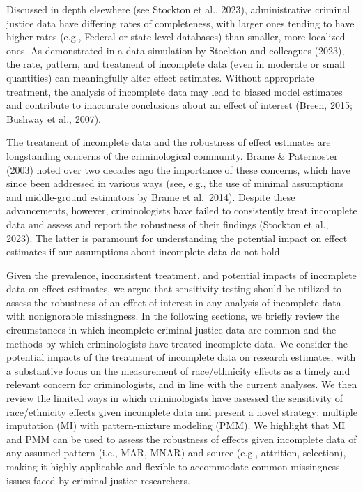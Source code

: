 \documentclass[
  letterpaper,
  DIV=11,
  numbers=noendperiod]{scrartcl}
\begin{document}
Discussed in depth elsewhere (see Stockton et al., 2023), administrative
criminal justice data have differing rates of completeness, with larger
ones tending to have higher rates (e.g., Federal or state-level
databases) than smaller, more localized ones. As demonstrated in a data
simulation by Stockton and colleagues (2023), the rate, pattern, and
treatment of incomplete data (even in moderate or small quantities) can
meaningfully alter effect estimates. Without appropriate treatment, the
analysis of incomplete data may lead to biased model estimates and
contribute to inaccurate conclusions about an effect of interest (Breen,
2015; Bushway et al., 2007).

The treatment of incomplete data and the robustness of effect estimates
are longstanding concerns of the criminological community. Brame \&
Paternoster (2003) noted over two decades ago the importance of these
concerns, which have since been addressed in various ways (see, e.g.,
the use of minimal assumptions and middle-ground estimators by Brame et
al.~2014). Despite these advancements, however, criminologists have
failed to consistently treat incomplete data and assess and report the
robustness of their findings (Stockton et al., 2023). The latter is
paramount for understanding the potential impact on effect estimates if
our assumptions about incomplete data do not hold.

Given the prevalence, inconsistent treatment, and potential impacts of
incomplete data on effect estimates, we argue that sensitivity testing
should be utilized to assess the robustness of an effect of interest in
any analysis of incomplete data with nonignorable missingness. In the
following sections, we briefly review the circumstances in which
incomplete criminal justice data are common and the methods by which
criminologists have treated incomplete data. We consider the potential
impacts of the treatment of incomplete data on research estimates, with
a substantive focus on the measurement of race/ethnicity effects as a
timely and relevant concern for criminologists, and in line with the
current analyses. We then review the limited ways in which
criminologists have assessed the sensitivity of race/ethnicity effects
given incomplete data and present a novel strategy: multiple imputation
(MI) with pattern-mixture modeling (PMM). We highlight that MI and PMM
can be used to assess the robustness of effects given incomplete data of
any assumed pattern (i.e., MAR, MNAR) and source (e.g., attrition,
selection), making it highly applicable and flexible to accommodate
common missingness issues faced by criminal justice researchers.
\end{document}
